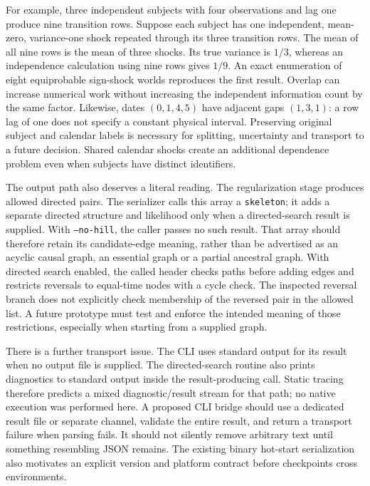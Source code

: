 For example, three independent subjects with four observations and lag one
produce nine transition rows. Suppose each subject has one independent,
mean-zero, variance-one shock repeated through its three transition rows.
The mean of all nine rows is the mean of three shocks. Its true variance is
$1/3$, whereas an independence calculation using nine rows gives $1/9$.
An exact enumeration of eight equiprobable sign-shock worlds reproduces the
first result. Overlap can increase numerical work without increasing the
independent information count by the same factor. Likewise, dates
$(0,1,4,5)$ have adjacent gaps $(1,3,1)$: a row lag of one does not specify a
constant physical interval. Preserving original subject and calendar labels
is necessary for splitting, uncertainty and transport to a future decision.
Shared calendar shocks create an additional dependence problem even when
subjects have distinct identifiers.\citep{exec16_ct_oracle}

The output path also deserves a literal reading. The regularization stage
produces allowed directed pairs. The serializer calls this array a
\texttt{skeleton}; it adds a separate directed structure and likelihood only
when a directed-search result is supplied. With \texttt{--no-hill}, the caller
passes no such result. That array should therefore retain its candidate-edge
meaning, rather than be advertised as an acyclic causal graph, an essential
graph or a partial ancestral graph. With directed search enabled, the called
header checks paths before adding edges and restricts reversals to equal-time
nodes with a cycle check. The inspected reversal branch does not explicitly
check membership of the reversed pair in the allowed list. A future prototype
must test and enforce the intended meaning of those restrictions, especially
when starting from a supplied graph.\citep{exec16_ct_sdbn}

There is a further transport issue. The CLI uses standard output for its result
when no output file is supplied. The directed-search routine also prints
diagnostics to standard output inside the result-producing call. Static tracing
therefore predicts a mixed diagnostic/result stream for that path; no native
execution was performed here. A proposed CLI bridge should use a dedicated
result file or separate channel, validate the entire result, and return a
transport failure when parsing fails. It should not silently remove arbitrary
text until something resembling JSON remains. The existing binary hot-start
serialization also motivates an explicit version and platform contract before
checkpoints cross environments.\citep{exec16_ct_sdbn,exec16_ct_design}


